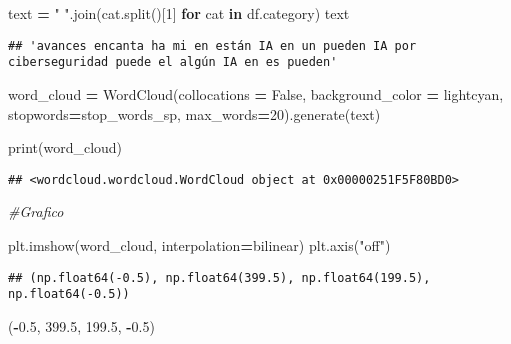 \documentclass[
]{article}
\newenvironment{Shaded}{\begin{snugshade}}{\end{snugshade}}
\newcommand{\BuiltInTok}[1]{#1}
\newcommand{\CommentTok}[1]{\textcolor[rgb]{0.56,0.35,0.01}{\textit{#1}}}
\newcommand{\ControlFlowTok}[1]{\textcolor[rgb]{0.13,0.29,0.53}{\textbf{#1}}}
\newcommand{\DecValTok}[1]{\textcolor[rgb]{0.00,0.00,0.81}{#1}}
\newcommand{\FloatTok}[1]{\textcolor[rgb]{0.00,0.00,0.81}{#1}}
\newcommand{\KeywordTok}[1]{\textcolor[rgb]{0.13,0.29,0.53}{\textbf{#1}}}
\newcommand{\NormalTok}[1]{#1}
\newcommand{\OperatorTok}[1]{\textcolor[rgb]{0.81,0.36,0.00}{\textbf{#1}}}
\newcommand{\StringTok}[1]{\textcolor[rgb]{0.31,0.60,0.02}{#1}}
\newcommand{\VariableTok}[1]{\textcolor[rgb]{0.00,0.00,0.00}{#1}}
\begin{document}
\begin{Shaded}
\begin{Highlighting}[]
\NormalTok{text }\OperatorTok{=} \StringTok{" "}\NormalTok{.join(cat.split()[}\DecValTok{1}\NormalTok{] }\ControlFlowTok{for}\NormalTok{ cat }\KeywordTok{in}\NormalTok{ df.category)}
\NormalTok{text}
\end{Highlighting}
\end{Shaded}

\begin{verbatim}
## 'avances encanta ha mi en están IA en un pueden IA por ciberseguridad puede el algún IA en es pueden'
\end{verbatim}

\begin{Shaded}
\begin{Highlighting}[]
\NormalTok{word\_cloud }\OperatorTok{=}\NormalTok{ WordCloud(collocations }\OperatorTok{=} \VariableTok{False}\NormalTok{, background\_color }\OperatorTok{=} \StringTok{\textquotesingle{}lightcyan\textquotesingle{}}\NormalTok{, stopwords}\OperatorTok{=}\NormalTok{stop\_words\_sp, max\_words}\OperatorTok{=}\DecValTok{20}\NormalTok{).generate(text)}
 
\BuiltInTok{print}\NormalTok{(word\_cloud)}
\end{Highlighting}
\end{Shaded}

\begin{verbatim}
## <wordcloud.wordcloud.WordCloud object at 0x00000251F5F80BD0>
\end{verbatim}

\begin{Shaded}
\begin{Highlighting}[]
\CommentTok{\#Grafico}

\NormalTok{plt.imshow(word\_cloud, interpolation}\OperatorTok{=}\StringTok{\textquotesingle{}bilinear\textquotesingle{}}\NormalTok{)}
\NormalTok{plt.axis(}\StringTok{"off"}\NormalTok{)}
\end{Highlighting}
\end{Shaded}

\begin{verbatim}
## (np.float64(-0.5), np.float64(399.5), np.float64(199.5), np.float64(-0.5))
\end{verbatim}

\begin{Shaded}
\begin{Highlighting}[]
\NormalTok{(}\OperatorTok{{-}}\FloatTok{0.5}\NormalTok{, }\FloatTok{399.5}\NormalTok{, }\FloatTok{199.5}\NormalTok{, }\OperatorTok{{-}}\FloatTok{0.5}\NormalTok{)}
\end{Highlighting}
\end{Shaded}
\end{document}
